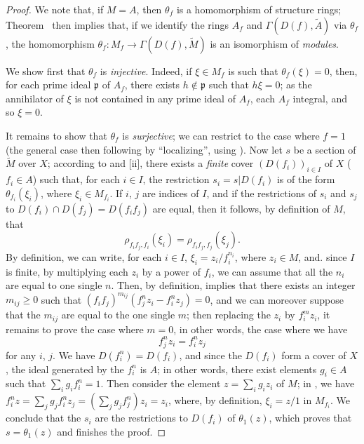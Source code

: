 \begin{proof}
We note that, if $M=A$, then $\theta_f$ is a homomorphism of structure rings;
Theorem~ then implies that, if we identify the rings $A_f$ and $\Gamma(D(f),\widetilde{A})$ via $\theta_f$, the homomorphism $\theta_f:M_f\to\Gamma(D(f),\widetilde{M})$ is an isomorphism of \emph{modules}.

We show first that $\theta_f$ is \emph{injective}.
Indeed, if $\xi\in M_f$ is such that $\theta_f(\xi)=0$, then, for each prime ideal $\mathfrak{p}$ of $A_f$, there exists $h\not\in\mathfrak{p}$ such that $h\xi=0$;
as the annihilator of $\xi$ is not contained in any prime ideal of $A_f$, each $A_f$ integral, and so $\xi=0$.

It remains to show that $\theta_f$ is \emph{surjective};
we can restrict to the case where $f=1$ (the general case then following by ``localizing'', using ).
Now let $s$ be a section of $\widetilde{M}$ over $X$;
according to  and [ii], there exists a \emph{finite} cover $(D(f_i))_{i\in I}$ of $X$ ($f_i\in A$) such that, for each $i\in I$, the restriction $s_i=s|D(f_i)$ is of the form $\theta_{f_i}(\xi_i)$, where $\xi_i\in M_{f_i}$.
If $i$, $j$ are indices of $I$, and if the restrictions of $s_i$ and $s_j$ to $D(f_i)\cap D(f_j)=D(f_i f_j)$ are equal, then it follows, by definition of $M$, that
\[
  \label{I.1.3.7.1}
  \rho_{f_i f_j,f_i}(\xi_i)=\rho_{f_i f_j,f_j}(\xi_j).
  \tag{1.3.7.1}
\]
By definition, we can write, for each $i\in I$, $\xi_i=z_i/f_i^{n_i}$, where $z_i\in M$, and. since $I$ is finite, by multiplying each $z_i$ by a power of $f_i$, we can assume that all the $n_i$ are equal to one single $n$.
Then, by definition,  implies that there exists an integer $m_{ij}\geq 0$ such that $(f_i f_j)^{m_{ij}}(f_j^n z_i-f_i^n z_j)=0$, and we can moreover suppose that the $m_{ij}$ are equal to the one single $m$;
then replacing the $z_i$ by $f_i^m z_i$, it remains to prove the case where $m=0$, in other words, the case where we have
\[
  \label{I.1.3.7.2}
  f_j^n z_i=f_i^n z_j
  \tag{1.3.7.2}
\]
for any $i$, $j$.
We have $D(f_i^n)=D(f_i)$, and since the $D(f_i)$ form a cover of $X$, the ideal generated by the $f_i^n$ is $A$;
in other words, there exist elements $g_i\in A$ such that $\sum_i g_i f_i^n=1$.
Then consider the element $z=\sum_i g_i z_i$ of $M$;
in , we have $f_i^n z=\sum_j g_j f_i^n z_j=(\sum_j g_j f_j^n)z_i=z_i$, where, by definition, $\xi_i=z/1$ in $M_{f_i}$.
We conclude
that the $s_i$ are the restrictions to $D(f_i)$ of $\theta_1(z)$, which proves that $s=\theta_1(z)$ and finishes the proof.
\end{proof}

